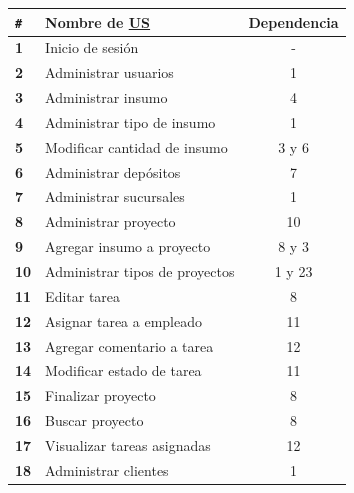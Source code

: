 \documentclass[a4paper, 12pt,twoside]{report}  %
\numberwithin{equation}{subsection} %
\begin{document}
\begin{table}[h!]
	\centering
	\begin{tabular}{ |p{0.5cm}|p{9cm}|c|  }
		\hline
		\verb|#|& \textbf{Nombre de \hyperlink{US}{US}}& \textbf{Dependencia} \\
		\hline
		\textbf{1} & \cellcolor{marca_US_realizada_anterior}Inicio de sesión & - \\
		\hline
		\textbf{2} & \cellcolor{marca_US_realizada_anterior}Administrar usuarios & 1 \\
		\hline
		\textbf{3} & \cellcolor{marca_US_realizada_anterior}Administrar insumo & 4 \\
		\hline
		\textbf{4} & \cellcolor{marca_US_realizada_anterior}Administrar tipo de insumo & 1 \\
		\hline
		\textbf{5} & \cellcolor{marca_US_realizada_anterior}Modificar cantidad de insumo & 3 y 6 \\
		\hline
		\textbf{6} & \cellcolor{marca_US_realizada_anterior}Administrar depósitos & 7 \\
		\hline
		\textbf{7} & \cellcolor{marca_US_realizada_anterior}Administrar sucursales & 1 \\
		\hline
		\textbf{8} & \cellcolor{marca_US_realizada_anterior}Administrar proyecto & 10 \\
		\hline
		\textbf{9} & \cellcolor{marca_US_realizada}Agregar insumo a proyecto & 8 y 3 \\
		\hline
		\textbf{10} & \cellcolor{marca_US_realizada_anterior}Administrar tipos de proyectos & 1 y 23 \\
		\hline
		\textbf{11} & \cellcolor{marca_US_realizada}Editar tarea & 8 \\
		\hline
		\textbf{12} & \cellcolor{marca_US_realizada_anterior}Asignar tarea a empleado & 11\\
		\hline
		\textbf{13} & \cellcolor{marca_US_realizada}Agregar comentario a tarea & 12 \\
		\hline
		\textbf{14} & \cellcolor{marca_US_realizada}Modificar estado de tarea & 11 \\
		\hline
		\textbf{15} & \cellcolor{marca_US_realizada}Finalizar proyecto & 8 \\
		\hline
		\textbf{16} & \cellcolor{marca_US_realizada_anterior}Buscar proyecto & 8 \\
		\hline
		\textbf{17} & \cellcolor{marca_US_realizada_anterior}Visualizar tareas asignadas & 12 \\
		\hline
		\textbf{18} & \cellcolor{marca_US_realizada_anterior}Administrar clientes & 1 \\

\end{tabular}
\end{table}
\end{document}

